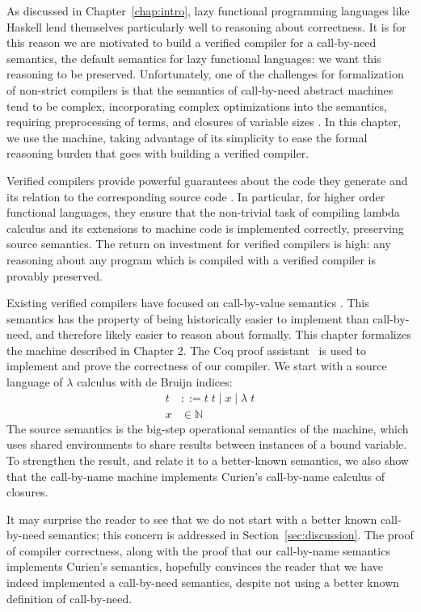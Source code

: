 \label{sec:introduction}
As discussed in Chapter~\ref{chap:intro}, lazy functional programming languages
like Haskell lend themselves particularly well to reasoning about correctness.
It is for this reason we are motivated to build a verified compiler for a
call-by-need semantics, the default semantics for lazy functional languages: we
want this reasoning to be preserved.  Unfortunately, one of the challenges for
formalization of non-strict compilers is that the semantics of call-by-need
abstract machines tend to be complex, incorporating complex optimizations into
the semantics, requiring preprocessing of terms, and closures of variable sizes
\cite{jonesstg, TIM}.  In this chapter, we use the \ce machine, taking advantage
of its simplicity to ease the formal reasoning burden that goes with building a
verified compiler.

Verified compilers provide powerful guarantees about the code they generate and
its relation to the corresponding source code \cite{chlipala2007certified,
leroy2012compcert, cakeml14}.  In particular, for higher order functional
languages, they ensure that the non-trivial task of compiling lambda
calculus and its extensions to machine code is implemented correctly,
preserving source semantics. The return on investment for verified compilers is
high: any reasoning about any program which is compiled with a verified compiler
is provably preserved. 

Existing verified compilers have focused on call-by-value semantics
\cite{chlipala2007certified, leroy2012compcert, cakeml14}. This semantics has
the property of being historically easier to implement than call-by-need, and
therefore likely easier to reason about formally. This chapter formalizes the
\ce machine described in Chapter 2. The Coq proof assistant~\cite{barras1997coq}
is used to implement and prove the correctness of our compiler. We start with a
source language of $\lambda$ calculus with de Bruijn indices: 
\begin{align*}
 t &::= t \; t \; | \; x \; | \;  \lambda \; t \\
 x &\in \mathbb{N}
\end{align*}
The source semantics is the big-step operational semantics of the \ce 
machine, which uses shared environments to share results between instances of a
bound variable. To strengthen the result, and relate it to a better-known
semantics, we also show that the call-by-name \ce machine implements Curien's
call-by-name calculus of closures. 

It may surprise the reader to see that we do not start with a better known
call-by-need semantics; this concern is addressed in
Section~\ref{sec:discussion}. The proof of compiler correctness, along with the
proof that our call-by-name semantics implements Curien's semantics, hopefully
convinces the reader that we have indeed implemented a call-by-need semantics,
despite not using a better known definition of call-by-need. 

